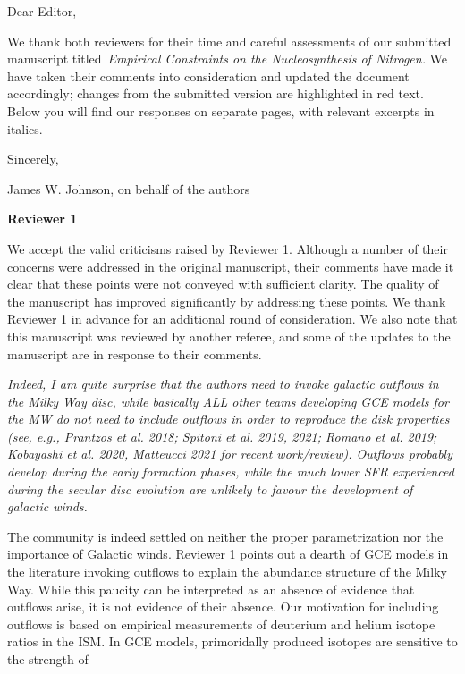 \documentclass[12pt]{article}
\newcommand\doublebreak[0]{\par\null\par\noindent}
\begin{document}
\noindent
Dear Editor,
\par\null\par\noindent
We thank both reviewers for their time and careful assessments of our
submitted manuscript titled~\textit{Empirical Constraints on the
Nucleosynthesis of Nitrogen.}
We have taken their comments into consideration and updated the document
accordingly; changes from the submitted version are highlighted in red text.
Below you will find our responses on separate pages, with relevant excerpts in
italics.
\doublebreak\null\doublebreak
Sincerely,
\doublebreak
James W. Johnson, on behalf of the authors
\newpage
\begin{center}
\textbf{Reviewer 1}
\makebox[\linewidth]{\rule{0.5\textwidth}{0.4pt}}
\end{center}
\par\noindent
We accept the valid criticisms raised by Reviewer 1.
Although a number of their concerns were addressed in the original manuscript,
their comments have made it clear that these points were not conveyed with
sufficient clarity.
The quality of the manuscript has improved significantly by
addressing these points.
We thank Reviewer 1 in advance for an additional round of consideration.
We also note that this manuscript was reviewed by another referee, and some of
the updates to the manuscript are in response to their comments.
\doublebreak
\textit{%
Indeed, I am quite surprise that the authors need to invoke galactic outflows
in the Milky Way disc, while basically ALL other teams developing GCE models
for the MW do not need to include outflows in order to reproduce the disk
properties (see, e.g., Prantzos et al. 2018; Spitoni et al. 2019, 2021; Romano
et al. 2019; Kobayashi et al. 2020, Matteucci 2021 for recent work/review).
Outflows probably develop during the early formation phases, while the much
lower SFR experienced during the secular disc evolution are unlikely to favour
the development of galactic winds.
}
\doublebreak
The community is indeed settled on neither the proper parametrization nor the
importance of Galactic winds.
Reviewer 1 points out a dearth of GCE models in the literature invoking
outflows to explain the abundance structure of the Milky Way.
While this paucity can be interpreted as an absence of evidence that outflows
arise, it is not evidence of their absence.
Our motivation for including outflows is based on empirical measurements of
deuterium and helium isotope ratios in the ISM.
In GCE models, primoridally produced isotopes are sensitive to the strength of
\end{document}
